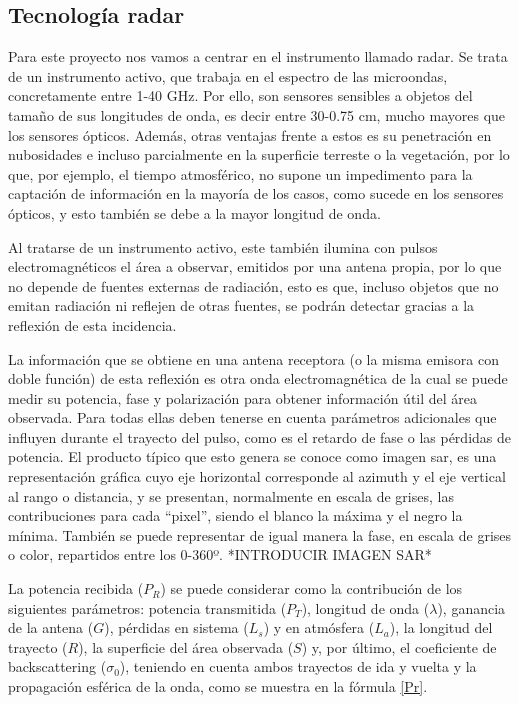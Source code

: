 \subsection{Tecnología radar}
\par Para este proyecto nos vamos a centrar en el instrumento llamado radar. Se trata de un instrumento activo, que trabaja en el espectro de las microondas, concretamente entre 1-40 GHz. Por ello, son sensores sensibles a objetos del tamaño de sus longitudes de onda, es decir entre 30-0.75 cm, mucho mayores que los sensores ópticos. Además, otras ventajas frente a estos es su penetración en nubosidades e incluso parcialmente en la superficie terreste o la vegetación, por lo que, por ejemplo, el tiempo atmosférico, no supone un impedimento para la captación de información en la mayoría de los casos, como sucede en los sensores ópticos, y esto también se debe a la mayor longitud de onda.
\\
\par Al tratarse de un instrumento activo, este también ilumina con pulsos electromagnéticos el área a observar, emitidos por una antena propia, por lo que no depende de fuentes externas de radiación, esto es que, incluso objetos que no emitan radiación ni reflejen de otras fuentes, se podrán detectar gracias a la reflexión de esta incidencia. 
\\ 
\par La información que se obtiene en una antena receptora (o la misma emisora con doble función) de esta reflexión es otra onda electromagnética de la cual se puede medir su potencia, fase y polarización para obtener información útil del área observada. Para todas ellas deben tenerse en cuenta parámetros adicionales que influyen durante el trayecto del pulso, como es el retardo de fase o las pérdidas de potencia. El producto típico que esto genera se conoce como imagen \gls{sar}, es una representación gráfica cuyo eje horizontal corresponde al azimuth y el eje vertical al rango o distancia, y se presentan, normalmente en escala de grises, las contribuciones para cada ``pixel'', siendo el blanco la máxima y el negro la mínima. También se puede representar de igual manera la fase, en escala de grises o color, repartidos entre los 0-360º. *INTRODUCIR IMAGEN SAR*
\\
\par La potencia recibida ($P_{R}$) se puede considerar como la contribución de los siguientes parámetros: potencia transmitida ($P_{T}$), longitud de onda ($\lambda$), ganancia de la antena ($G$), pérdidas en sistema ($L_{s}$) y en atmósfera ($L_{a}$), la longitud del trayecto ($R$), la superficie del área observada ($S$) y, por último, el coeficiente de backscattering ($\sigma_{0}$), teniendo en cuenta ambos trayectos de ida y vuelta y la propagación esférica de la onda, como se muestra en la fórmula \ref{Pr}. 
